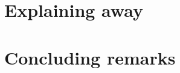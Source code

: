 \documentclass[hidelinks,12pt]{report}
\begin{document}
    \chapter{Explaining away}
    
    
    \chapter{Concluding remarks}
    

    \printbibliography

    
    
    \appendix
    




\end{document}
